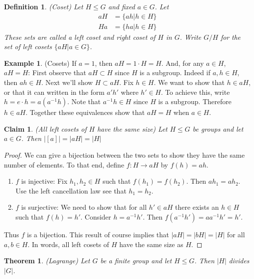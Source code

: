 \documentclass[12pt]{article}
\newtheorem{theorem}{Theorem}
\newtheorem{claim}{Claim}
\newtheorem{definition}{Definition}
\theoremstyle{definition}
\newtheorem{example}{Example}
\theoremstyle{definition}
\begin{document}
\begin{definition}(Coset)
Let $H \leq G$ and fixed $a \in G$. Let
\begin{align*}
aH &= \{ ah | h \in H \} \\
Ha &= \{ ha | h \in H \} 
\end{align*}
These sets are called a left coset and right coset of $H$ in $G$. Write $G/H$ for the set of left cosets $\{aH | a \in G \}$.
\end{definition}

\begin{example}(Cosets)
If $a=1$, then $aH = 1 \cdot H = H$. And, for any $a \in H$, $aH = H$: First observe that $aH \subset H$ since $H$ is a subgroup. Indeed if $a,h \in H$, then $ah \in H$. Next we'll show $H \subset aH$. Fix $h \in H$. We want to show that $h \in aH$, or that it can written in the form $a'h'$ where $h' \in H$. To achieve this, write $h = e \cdot h = a (a^{-1} h)$. Note that $a^{-1} h \in H$ since $H$ is a subgroup. Therefore $h \in aH$. Together these equivalences show that $aH = H$ when $a \in H$. 
\end{example}

\begin{claim}(All left cosets of $H$ have the same size) 
Let $H \leq G$ be groups and let $a \in G$. Then $|[a] | = |aH| = |H|$
\end{claim}
\begin{proof}
We can give a bijection between the two sets to show they have the same number of elements. To that end, define $f: H \to aH$ by $f(h) = ah$. 
\begin{enumerate}
	\item $f$ is injective: Fix $h_1, h_2 \in H$ such that $f(h_1) = f(h_2)$. Then $a h_1 = a h_2$. Use the left cancellation law see that $h_1 = h_2$. 
	\item $f$ is surjective: We need to show that for all $h' \in aH$ there exists an $h \in H$ such that $f(h) = h'$. Consider $h = a^{-1} h'$. Then $f(a^{-1} h') = a a^{-1} h' = h'$. 
\end{enumerate}
Thus $f$ is a bijection. This result of course implies that $|aH| = |bH| = |H|$ for all $a, b \in H$. In words, all left cosets of $H$ have the same size as $H$. 
\end{proof}

\begin{theorem}(Lagrange)
	Let $G$ be a finite group and let $H \leq G$. Then $|H|$ divides $|G|$.
\end{theorem}
\end{document}
